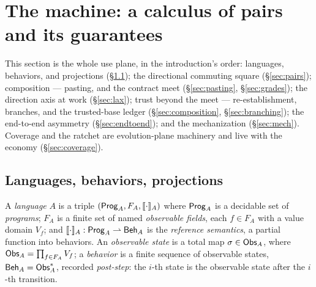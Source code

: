 
\section{The machine: a calculus of pairs and its guarantees}
\label{sec:calculus}

This section is the whole use plane, in the introduction's order:
languages, behaviors, and projections (\S\ref{sec:languages}); the
directional commuting square (\S\ref{sec:pairs}); composition ---
pasting, and the contract meet (\S\ref{sec:pasting},
\S\ref{sec:grades}); the direction axis at work (\S\ref{sec:lax});
trust beyond the meet --- re-establishment, branches, and the
trusted-base ledger (\S\ref{sec:composition},
\S\ref{sec:branching}); the end-to-end asymmetry
(\S\ref{sec:endtoend}); and the mechanization (\S\ref{sec:mech}).
Coverage and the ratchet are evolution-plane machinery and live with
the economy (\S\ref{sec:coverage}).

\subsection{Languages, behaviors, projections}
\label{sec:languages}

\begin{definition}[Language]
\label{def:language}
A \emph{language} $A$ is a triple $(\mathsf{Prog}_{A}, F_A, \llbracket \cdot \rrbracket_{A})$ where
$\mathsf{Prog}_{A}$ is a decidable set of \emph{programs}; $F_A$ is a finite set of
named \emph{observable fields}, each $f \in F_A$ with a value domain
$V_f$; and $\llbracket \cdot \rrbracket_{A} : \mathsf{Prog}_{A} \rightharpoonup \mathsf{Beh}_{A}$ is the
\emph{reference semantics}, a partial function into behaviors.
An \emph{observable state} is a total map
$\sigma \in \mathsf{Obs}_{A}$, where $\mathsf{Obs}_{A} = \prod_{f \in F_A} V_f$; a
\emph{behavior} is a finite sequence of observable states,
$\mathsf{Beh}_{A} = \mathsf{Obs}_{A}^{*}$, recorded \emph{post-step}: the $i$-th state is
the observable state after the $i$-th transition.
\end{definition}

